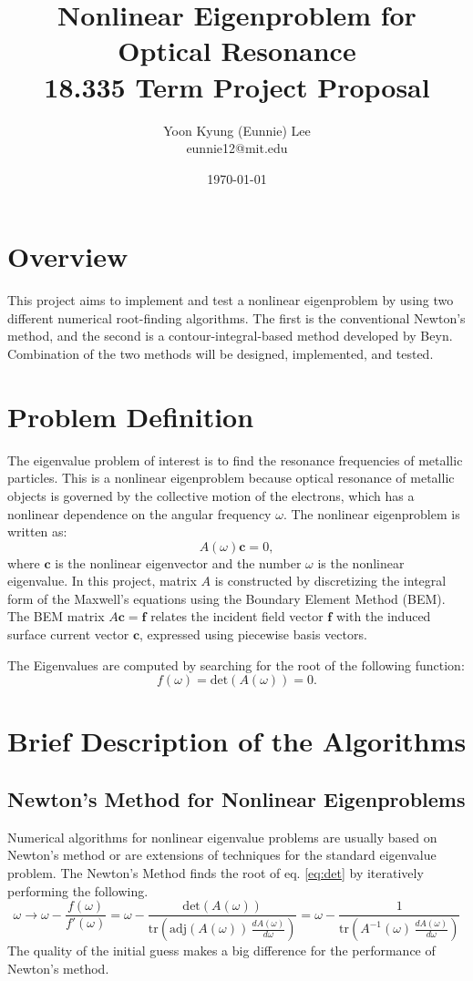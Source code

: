 \documentclass[11pt,letterpaper]{article}
\author{Yoon Kyung (Eunnie) Lee \\eunnie12@mit.edu}
\title{\textbf{Nonlinear Eigenproblem for Optical Resonance}\\18.335 Term Project Proposal}
\date{\today}
\begin{document}
\maketitle
\section*{Overview}
This project aims to implement and test a nonlinear eigenproblem by using two different numerical root-finding algorithms. The first is the conventional Newton's method, and the second is a contour-integral-based method developed by Beyn.\citep{beyn_integral_2012} Combination of the two methods will be designed, implemented, and tested. 

\section*{Problem Definition}
The eigenvalue problem of interest is to find the resonance frequencies of metallic particles. This is a nonlinear eigenproblem because optical resonance of metallic objects is governed by the collective motion of the electrons, which has a nonlinear dependence on the angular frequency $\omega$. The nonlinear eigenproblem is written as:
\begin{equation}\label{eq:Eig}
    A(\omega) \mathbf{c} = 0,
\end{equation}
where $\mathbf{c}$ is the nonlinear eigenvector and the number $\omega$ is the nonlinear eigenvalue. 
In this project, matrix $A$ is constructed by discretizing the integral form of the Maxwell's equations using the Boundary Element Method (BEM). The BEM matrix $A\mathbf{c}=\mathbf{f}$ relates the incident field vector $\mathbf{f}$ with the induced surface current vector $\mathbf{c}$, expressed using piecewise basis vectors. 

The Eigenvalues are computed by searching for the root of the following function:
\begin{equation}\label{eq:det}
f(\omega)=\text{det}\left(A(\omega)\right) = 0.
\end{equation}  
\section*{Brief Description of the Algorithms}
\subsection*{Newton's Method for Nonlinear Eigenproblems}
Numerical algorithms for nonlinear eigenvalue problems are usually based on Newton's method or are extensions of techniques for the standard eigenvalue problem. The Newton's Method finds the root of eq. \ref{eq:det} by iteratively performing the following.
\begin{equation}
\omega \rightarrow \omega - \frac{f(\omega)}{f'(\omega)} = \omega - \frac{\mathrm{det}(A(\omega))}{ \mathrm{tr} \left( \mathrm{adj}(A(\omega))\,\frac{dA(\omega)}{d\omega} \right)}
= \omega - \frac{1}{ \mathrm{tr} \left( A^{-1}(\omega)\,\frac{dA(\omega)}{d\omega} \right)}
\end{equation}
The quality of the initial guess makes a big difference for the performance of Newton's method. 
\end{document}
